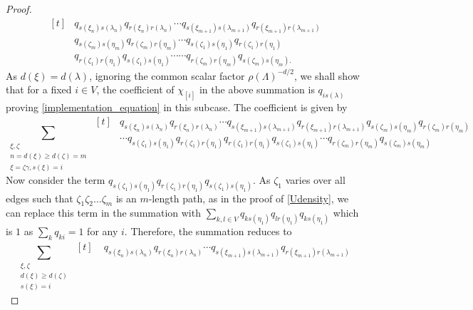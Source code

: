 \documentclass{amsart}
\theoremstyle{plain}
\theoremstyle{definition}
\theoremstyle{remark}
\numberwithin{equation}{section}
\begin{document}
\begin{proof}
\begin{equation*}
\begin{aligned}[t]
&q_{s(\xi_{n})s(\lambda_{n})}q_{r(\xi_{n})r(\lambda_{n})}
\cdots q_{s(\xi_{m+1})s(\lambda_{m+1})}q_{r(\xi_{m+1})r(\lambda_{m+1})}\\
&q_{s(\zeta_{m})s(\eta_{m})}q_{r(\zeta_{m})r(\eta_{m})}
\cdots
q_{s(\zeta_{1})s(\eta_{1})}q_{r(\zeta_{1})r(\eta_{1})}\\
&q_{r(\zeta_{1})r(\eta_{1})}q_{s(\zeta_{1})s(\eta_{1})}\cdots\cdots q_{r(\zeta_{m})r(\eta_{m})}q_{s(\zeta_{m})s(\eta_{m}).}
\end{aligned}
\end{equation*}
As $d(\xi)=d(\lambda)$, ignoring the common scalar factor $\rho(\Lambda)^{-d/2}$, we shall show that for a fixed $i\in V$, the coefficient of $\chi_{[i]}$ in the above summation is $q_{is(\lambda)}$ proving \ref{implementation_equation} in this subcase. The coefficient is given by
\begin{equation*}
    \sum\limits_{\substack{\xi,\zeta\\ n=d(\xi)\geq d(\zeta)=m \\ \xi=\zeta\gamma, s(\xi)=i}}
\begin{aligned}[t]
&q_{s(\xi_{n})s(\lambda_{n})}q_{r(\xi_{n})r(\lambda_{n})}
\cdots q_{s(\xi_{m+1})s(\lambda_{m+1})}q_{r(\xi_{m+1})r(\lambda_{m+1})}q_{s(\zeta_{m})s(\eta_{m})}q_{r(\zeta_{m})r(\eta_{m})}
\\
&\cdots q_{s(\zeta_{1})s(\eta_{1})}q_{r(\zeta_{1})r(\eta_{1})}q_{r(\zeta_{1})r(\eta_{1})}q_{s(\zeta_{1})s(\eta_{1})}\cdots q_{r(\zeta_{m})r(\eta_{m})}q_{s(\zeta_{m})s(\eta_{m})}
\end{aligned}
\end{equation*}
Now consider the term $q_{s(\zeta_{1})s(\eta_{1})}q_{r(\zeta_{1})r(\eta_{1})}q_{s(\zeta_{1})s(\eta_{1})}$. As $\zeta_{1}$ varies over all edges such that $\zeta_{1}\zeta_{2}\ldots\zeta_{m}$ is an $m$-length path, as in the proof of \ref{Udensity}, we can replace this term in the summation with $\sum_{k,l\in V}q_{ks(\eta_{1})}q_{lr(\eta_{1})}q_{ks(\eta_{1})}$ which is $1$ as $\sum_{k}q_{ki}=1$ for any $i$. Therefore, the summation reduces to
\begin{equation*}
    \sum\limits_{\substack{\xi,\zeta\\ d(\xi)\geq d(\zeta) \\
s(\xi)=i}}
\begin{aligned}[t]
&\;q_{s(\xi_{n})s(\lambda_{n})}q_{r(\xi_{n})r(\lambda_{n})}\cdots
q_{s(\xi_{m+1})s(\lambda_{m+1})}q_{r(\xi_{m+1})r(\lambda_{m+1})}
\\

\end{aligned}
\end{equation*}
\end{proof}
\end{document}
